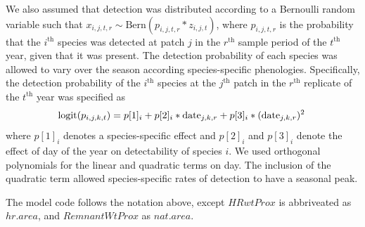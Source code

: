 \documentclass{article}\usepackage[]{graphicx}\usepackage[]{color}
\begin{document}
We also assumed that detection was distributed according to a Bernoulli random variable such that $x_{i,j,t,r} \sim \mathrm{Bern}(p_{i,j,t,r}*z_{i,j,t})$, where $p_{i,j,t,r}$ is the
probability that the $i^{\mathrm{th}}$ species was detected at patch
$j$ in the $r^{\mathrm{th}}$ sample period of the $t^{\mathrm{th}}$
year, given that it was present. The detection probability of each species was allowed to vary over the season
according species-specific phenologies. Specifically, the detection
probability of the $i^{\mathrm{th}}$ species at the $j^{\mathrm{th}}$
patch in the $r^{\mathrm{th}}$ replicate of the $t^{\mathrm{th}}$ year
was specified as
%
\begin{equation}
  \label{eq:detection}
    \mathrm{logit}(p_{i,j,k,t}) = p[1]_i +
    p[2]_i * \mathrm{date}_{j,k,r} +
    p[3]_i * (\mathrm{date}_{j,k,r})^2\hspace{0.2em}
\end{equation}
%
where $p[1]_i$ denotes a species-specific effect and $p[2]_i$ and
$p[3]_i$ denote the effect of day of the year on detectability of
species $i$.  We used orthogonal polynomials for the linear and
quadratic terms on day. The inclusion of the quadratic term allowed
species-specific rates of detection to have a seasonal peak.


The model code follows the notation above, except $HRwtProx$ is
abbriveated as $hr.area$, and $RemnantWtProx$ as $nat.area$. 
\end{document}
